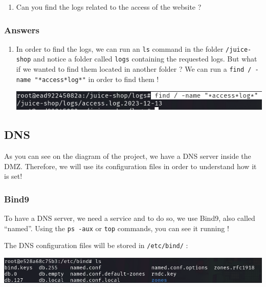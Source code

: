\documentclass[a4paper,11pt,singlespacing]{article}
\providecommand{\tightlist}{%
  \setlength{\itemsep}{0pt}\setlength{\parskip}{0pt}}
\begin{document}
\begin{enumerate}
\def\labelenumi{\arabic{enumi}.}
\tightlist
\item
  Can you find the logs related to the access of the website ?
\end{enumerate}

\newpage

\subsubsection{Answers}\label{answers-2}

\begin{enumerate}
\def\labelenumi{\arabic{enumi}.}
\item
  In order to find the logs, we can run an \texttt{ls} command in the
  folder \texttt{/juice-shop} and notice a folder called \texttt{logs}
  containing the requested logs. But what if we wanted to find them
  located in another folder ? We can run a
  \texttt{find\ /\ -name\ "*access*log*"} in order to find them !

  \includegraphics{Images/Image08.png}
\end{enumerate}

\subsection{DNS}\label{dns}

As you can see on the diagram of the project, we have a DNS server
inside the DMZ. Therefore, we will use its configuration files in order
to understand how it is set!

\subsubsection{Bind9}\label{bind9}

To have a DNS server, we need a service and to do so, we use Bind9, also
called ``named''. Using the \texttt{ps\ -aux} or \texttt{top} commands,
you can see it running !

The DNS configuration files will be stored in \texttt{/etc/bind/} :

\includegraphics{Images/Image09.png}
\end{document}
